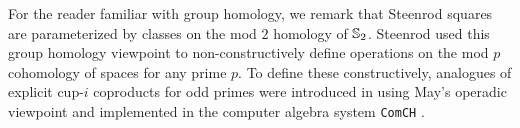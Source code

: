 \begin{remark}
	For the reader familiar with group homology, we remark that Steenrod squares are parameterized by classes on the mod $2$ homology of $\mathbb{S}_2$.
	Steenrod used this group homology viewpoint to non-constructively define operations on the mod $p$ cohomology of spaces \cite{steenrod1952reduced, steenrod1953cyclic, steenrod1962cohomology} for any prime $p$.
	To define these constructively, analogues of explicit cup-$i$ coproducts for odd primes were introduced in \cite{medina2021may_st} using May's operadic viewpoint \cite{may1970general} and implemented in the computer algebra system \texttt{ComCH} \cite{medina2021comch}.
\end{remark}